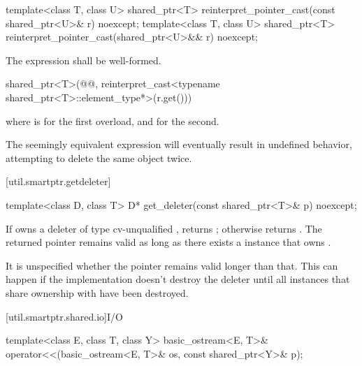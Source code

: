 %
\begin{itemdecl}
template<class T, class U>
  shared_ptr<T> reinterpret_pointer_cast(const shared_ptr<U>& r) noexcept;
template<class T, class U>
  shared_ptr<T> reinterpret_pointer_cast(shared_ptr<U>&& r) noexcept;
\end{itemdecl}

\begin{itemdescr}
\pnum
\requires The expression 
shall be well-formed.

\pnum
\returns
\begin{codeblock}
shared_ptr<T>(@@, reinterpret_cast<typename shared_ptr<T>::element_type*>(r.get()))
\end{codeblock}
where  is  for the first overload, and
 for the second.

\pnum
\begin{note}
The seemingly equivalent expression
 will eventually result in
undefined behavior, attempting to delete the same object twice.
\end{note}
\end{itemdescr}

[util.smartptr.getdeleter]{}

%
\begin{itemdecl}
template<class D, class T>
  D* get_deleter(const shared_ptr<T>& p) noexcept;
\end{itemdecl}

\begin{itemdescr}
\pnum
\returns
If  owns a deleter  of type cv-unqualified
, returns ; otherwise returns .
The returned
pointer remains valid as long as there exists a  instance
that owns .
\begin{note}
It is unspecified whether the pointer
remains valid longer than that. This can happen if the implementation doesn't destroy
the deleter until all  instances that share ownership with
 have been destroyed.
\end{note}
\end{itemdescr}

[util.smartptr.shared.io]{I/O}

%
\begin{itemdecl}
template<class E, class T, class Y>
  basic_ostream<E, T>& operator<<(basic_ostream<E, T>& os, const shared_ptr<Y>& p);
\end{itemdecl}

